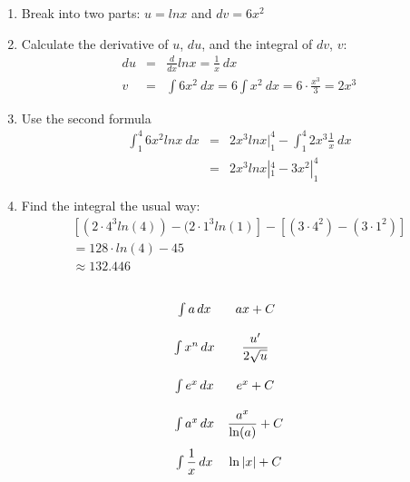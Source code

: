 \begin{enumerate}
	\item Break into two parts: $u = ln x$ and $dv = 6x^2$
	\item Calculate the derivative of $u$, $du$, and the integral of $dv$, $v$:
	  \begin{eqnarray}
	    du &=& \frac{d}{dx} ln x = \frac{1}{x} ~dx \\
		v  &=& \int 6x^2 ~dx = 6 \int x^2 ~dx = 6 \cdot \frac{x^3}{3} = 2x^3
	  \end{eqnarray}
	\item Use the second formula
	  \begin{eqnarray}
	    \int_1^4 6x^2 ln x ~dx &=& 2x^3 ln x |_1^4 - \int_1^4 2x^3 \frac{1}{x} ~dx \\
		&=& 2x^3 ln x |_1^4 - 3x^2 |_1^4
	  \end{eqnarray}
	\item Find the integral the usual way:
	  \begin{eqnarray}
	    \left[ (2 \cdot 4^3 ln(4)) - (2 \cdot 1^3 ln(1)\right] - \left[ (3 \cdot 4^2) - (3 \cdot 1^2)  \right] \\
		  = 128 \cdot ln(4) - 45 \\
		  \approx 132.446
	  \end{eqnarray}
\end{enumerate}





\hformbar













\begin{center}
\[
\def\arraystretch{2.5}
 \begin{array}{cc}
  \int a\,dx              & ax+C                   \\
  \int x^n\,dx            & \dfrac{u'}{2\sqrt{u}}  \\
  \int e^x\,dx            & e^x+C                  \\
  \int a^x\,dx           & \dfrac{a^x}{\ln(a)}+C  \\
  \int \dfrac{1}{x}\, dx  &  \ln|x|+C
 \end{array}
\]
\end{center}
\hformbar










\newpage

